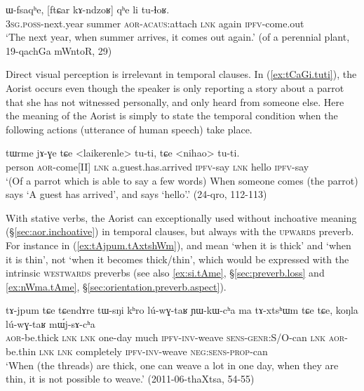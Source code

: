 \begin{exe}
\ex \label{ex:ftCar.kAndzoR.tulhoR}
 \gll ɯ-fsaqʰe, [ftɕar kɤ-ndzoʁ] qʰe li tu-ɬoʁ. \\
 \textsc{3sg}.\textsc{poss}-next.year summer \textsc{aor}-\textsc{acaus}:attach \textsc{lnk} again \textsc{ipfv}-come.out \\
 \glt `The next year, when summer arrives, it comes out again.' (of a perennial plant, 19-qachGa mWntoR, 29)
\end{exe}

Direct visual perception is irrelevant in temporal clauses. In (\ref{ex:tCaGi.tuti}), the Aorist  occurs even though the speaker is only reporting a story about a parrot that she has not witnessed personally, and only heard from someone else. Here the meaning of the Aorist is simply to state the temporal condition when the following actions (utterance of human speech) take place.

\begin{exe}
\ex \label{ex:tCaGi.tuti}
 \gll tɯrme jɤ-ɣe tɕe <laikerenle> tu-ti, tɕe <nihao>  tu-ti. \\
 person \textsc{aor}-come[II] \textsc{lnk} a.guest.has.arrived \textsc{ipfv}-say \textsc{lnk} hello \textsc{ipfv}-say  \\
 \glt `(Of a parrot which is able to say a few words) When someone comes (the parrot) says `A guest has arrived', and says `hello'.' (24-qro, 112-113)
\end{exe}

With stative verbs, the Aorist can exceptionally used without inchoative meaning (§\ref{sec:aor.inchoative}) in temporal clauses, but always with the \textsc{upwards}  preverb. For instance in (\ref{ex:tAjpum.tAxtshWm}),  and  mean `when it is thick' and `when it is thin', not `when it becomes thick/thin', which would be expressed with the intrinsic \textsc{westwards} preverbs (see also \ref{ex:si.tAme}, §\ref{sec:preverb.loss} and \ref{ex:nWma.tAme}, §\ref{sec:orientation.preverb.aspect}). 

\begin{exe}
\ex \label{ex:tAjpum.tAxtshWm}
 \gll tɤ-jpum tɕe tɕendɤre tɯ-sŋi kʰro lú-wɣ-taʁ ɲɯ-kɯ-cʰa ma tɤ-xtsʰɯm tɕe tɕe, koŋla lú-wɣ-taʁ mɯ́j-sɤ-cʰa   \\
 \textsc{aor}-be.thick \textsc{lnk} \textsc{lnk} one-day much \textsc{ipfv}-\textsc{inv}-weave \textsc{sens}-\textsc{genr}:S/O-can \textsc{lnk} \textsc{aor}-be.thin \textsc{lnk} \textsc{lnk} completely \textsc{ipfv}-\textsc{inv}-weave \textsc{neg}:\textsc{sens}-\textsc{prop}-can \\
\glt `When (the threads) are thick, one can weave a lot in one day, when they are thin, it is not possible to weave.' (2011-06-thaXtsa, 54-55)
\end{exe}

